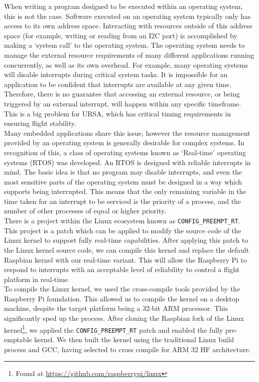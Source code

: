 \documentclass[capstone_report.tex]{subfiles}
\begin{document}
    When writing a program designed to be executed within an operating system, this is not the case. Software executed on an operating system typically only has access to its own address space. Interacting with resources outside of this address space (for example, writing or reading from an I2C port) is accomplished by making a `system call' to the operating system. The operating system needs to manage the external resource requirements of many different applications running concurrently, as well as its own overhead. For example, many operating systems will disable interrupts during critical system tasks. It is impossible for an application to be confident that interrupts are available at any given time. Therefore, there is no guarantee that accessing an external resource, or being triggered by an external interrupt, will happen within any specific timeframe. This is a big problem for URSA, which has critical timing requirements in ensuring flight stability.\\

    Many embedded applications share this issue, however the resource management provided by an operating system is generally desirable for complex systems. In recognition of this, a class of operating systems known as `Real-time' operating systems (RTOS) was developed. An RTOS is designed with reliable interrupts in mind. The basic idea is that no program may disable interrupts, and even the most sensitive parts of the operating system must be designed in a way which supports being interrupted. This means that the only remaining variable in the time taken for an interrupt to be serviced is the priority of a process, and the number of other processes of equal or higher priority.\\

    There is a project within the Linux ecosystem known as \texttt{CONFIG\_PREEMPT\_RT}. This project is a patch which can be applied to modify the source code of the Linux kernel to support fully real-time capabilities. After applying this patch to the Linux kernel source code, we can compile this kernel and replace the default Raspbian kernel with our real-time variant. This will allow the Raspberry Pi to respond to interrupts with an acceptable level of reliability to control a flight platform in real-time.\\

    To compile the Linux kernel, we used the cross-compile tools provided by the Raspberry Pi foundation. This allowed us to compile the kernel on a desktop machine, despite the target platform being a 32-bit ARM processor. This significantly sped up the process. After cloning the Raspbian fork of the Linux kernel\footnote{Found at \url{https://github.com/raspberrypi/linux}}, we applied the \texttt{CONFIG\_PREEMPT\_RT} patch and enabled the fully pre-emptable kernel. We then built the kernel using the traditional Linux build process and GCC, having selected to cross compile for ARM 32 HF architecture.\\
\end{document}
